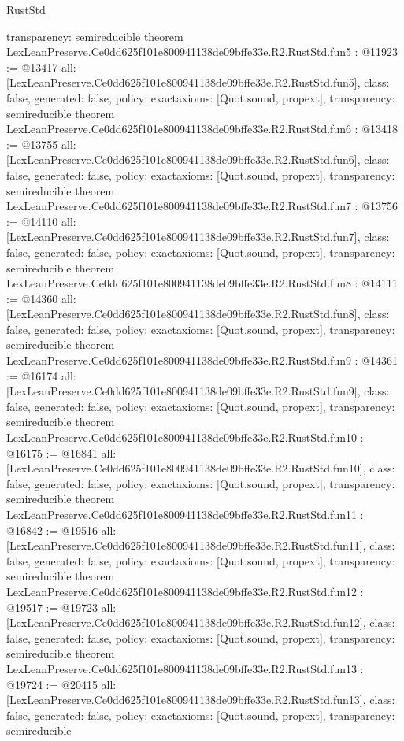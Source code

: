 \begin{lexlean}{RustStd}
\begin{coremodule}
{  transparency: semireducible
}
theorem LexLeanPreserve.Ce0dd625f101e800941138de09bffe33e.R2.RustStd.fun5 : @11923 := @13417 {
  all: [LexLeanPreserve.Ce0dd625f101e800941138de09bffe33e.R2.RustStd.fun5],
  class: false,
  generated: false,
  policy: exact{axioms: [Quot.sound, propext]},
  transparency: semireducible
}
theorem LexLeanPreserve.Ce0dd625f101e800941138de09bffe33e.R2.RustStd.fun6 : @13418 := @13755 {
  all: [LexLeanPreserve.Ce0dd625f101e800941138de09bffe33e.R2.RustStd.fun6],
  class: false,
  generated: false,
  policy: exact{axioms: [Quot.sound, propext]},
  transparency: semireducible
}
theorem LexLeanPreserve.Ce0dd625f101e800941138de09bffe33e.R2.RustStd.fun7 : @13756 := @14110 {
  all: [LexLeanPreserve.Ce0dd625f101e800941138de09bffe33e.R2.RustStd.fun7],
  class: false,
  generated: false,
  policy: exact{axioms: [Quot.sound, propext]},
  transparency: semireducible
}
theorem LexLeanPreserve.Ce0dd625f101e800941138de09bffe33e.R2.RustStd.fun8 : @14111 := @14360 {
  all: [LexLeanPreserve.Ce0dd625f101e800941138de09bffe33e.R2.RustStd.fun8],
  class: false,
  generated: false,
  policy: exact{axioms: [Quot.sound, propext]},
  transparency: semireducible
}
theorem LexLeanPreserve.Ce0dd625f101e800941138de09bffe33e.R2.RustStd.fun9 : @14361 := @16174 {
  all: [LexLeanPreserve.Ce0dd625f101e800941138de09bffe33e.R2.RustStd.fun9],
  class: false,
  generated: false,
  policy: exact{axioms: [Quot.sound, propext]},
  transparency: semireducible
}
theorem LexLeanPreserve.Ce0dd625f101e800941138de09bffe33e.R2.RustStd.fun10 : @16175 := @16841 {
  all: [LexLeanPreserve.Ce0dd625f101e800941138de09bffe33e.R2.RustStd.fun10],
  class: false,
  generated: false,
  policy: exact{axioms: [Quot.sound, propext]},
  transparency: semireducible
}
theorem LexLeanPreserve.Ce0dd625f101e800941138de09bffe33e.R2.RustStd.fun11 : @16842 := @19516 {
  all: [LexLeanPreserve.Ce0dd625f101e800941138de09bffe33e.R2.RustStd.fun11],
  class: false,
  generated: false,
  policy: exact{axioms: [Quot.sound, propext]},
  transparency: semireducible
}
theorem LexLeanPreserve.Ce0dd625f101e800941138de09bffe33e.R2.RustStd.fun12 : @19517 := @19723 {
  all: [LexLeanPreserve.Ce0dd625f101e800941138de09bffe33e.R2.RustStd.fun12],
  class: false,
  generated: false,
  policy: exact{axioms: [Quot.sound, propext]},
  transparency: semireducible
}
theorem LexLeanPreserve.Ce0dd625f101e800941138de09bffe33e.R2.RustStd.fun13 : @19724 := @20415 {
  all: [LexLeanPreserve.Ce0dd625f101e800941138de09bffe33e.R2.RustStd.fun13],
  class: false,
  generated: false,
  policy: exact{axioms: [Quot.sound, propext]},
  transparency: semireducible
}
\end{coremodule}
\end{lexlean}
